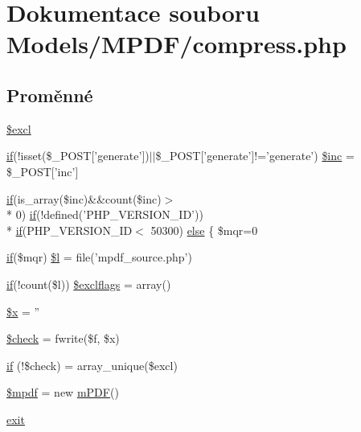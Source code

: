 \hypertarget{compress_8php}{\section{Dokumentace souboru Models/\-M\-P\-D\-F/compress.php}
\label{compress_8php}
}
\subsection*{Proměnné}
\begin{DoxyCompactItemize}
\item 
\hyperlink{compress_8php_a06e94f7ec9d696fff3dcad27ba6b6d61}{\$excl}
\item 
\hyperlink{pdf__parser_8php_af8105e84b42a9ceda5357caeb6c4760b}{if}(!isset(\$\-\_\-\-P\-O\-S\-T\mbox{[}'generate'\mbox{]})$|$$|$\$\-\_\-\-P\-O\-S\-T\mbox{[}'generate'\mbox{]}!='generate') \hyperlink{compress_8php_abd0a3dd79eead9d44a0c329f65d5370f}{\$inc} = \$\-\_\-\-P\-O\-S\-T\mbox{[}'inc'\mbox{]}
\item 
\hyperlink{pdf__parser_8php_af8105e84b42a9ceda5357caeb6c4760b}{if}(is\-\_\-array(\$inc)\&\&count(\$inc)$>$\\*
0) \hyperlink{pdf__parser_8php_af8105e84b42a9ceda5357caeb6c4760b}{if}(!defined('P\-H\-P\-\_\-\-V\-E\-R\-S\-I\-O\-N\-\_\-\-I\-D')) \\*
\hyperlink{pdf__parser_8php_af8105e84b42a9ceda5357caeb6c4760b}{if}(P\-H\-P\-\_\-\-V\-E\-R\-S\-I\-O\-N\-\_\-\-I\-D$<$ 50300) \hyperlink{compress_8php_af82782656503b252ac8af7dce0ca4bba}{else} \{ \$mqr=0
\item 
\hyperlink{pdf__parser_8php_af8105e84b42a9ceda5357caeb6c4760b}{if}(\$mqr) \hyperlink{compress_8php_af45644c73f443e318c38efee2cb538bc}{\$l} = file('mpdf\-\_\-source.\-php')
\item 
\hyperlink{pdf__parser_8php_af8105e84b42a9ceda5357caeb6c4760b}{if}(!count(\$l)) \hyperlink{compress_8php_a4907d78471b733b785612f142bb48713}{\$exclflags} = array()
\item 
\hyperlink{compress_8php_af3a16c5f0dd7a74cf9acf6a49fff73a7}{\$x} = ''
\item 
\hyperlink{compress_8php_a830cf70d25fefacddcf4c6bc3fd7a0e0}{\$check} = fwrite(\$f, \$x)
\item 
\hyperlink{compress_8php_a0ad06318b1464b4cece76cd1bb53ca79}{if} (!\$check) = array\-\_\-unique(\$excl)
\item 
\hyperlink{compress_8php_ad028f81910d6cbab9b184d2214b3a8f8}{\$mpdf} = new \hyperlink{classm_p_d_f}{m\-P\-D\-F}()
\item 
\hyperlink{compress_8php_a6733eb5f605d09eaede9845835d71c4e}{exit}
\end{DoxyCompactItemize}


